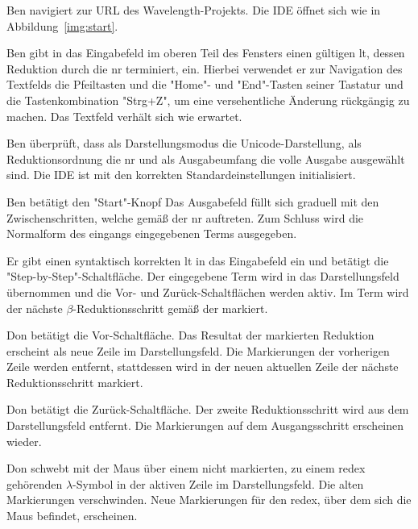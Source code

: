 \documentclass[parskip=full,11pt,twoside]{scrartcl}
\begin{document}
{Ben navigiert zur URL des Wavelength-Projekts.}
{Die IDE öffnet sich wie in Abbildung~\ref{img:start}.}

{Ben gibt in das Eingabefeld im oberen Teil des Fensters einen gültigen \gls{lt},
dessen Reduktion durch die \gls{nr} terminiert, ein.
Hierbei verwendet er zur Navigation des Textfelds die Pfeiltasten und die
"Home"- und "End"-Tasten seiner Tastatur und die Tastenkombination "Strg+Z", um eine
versehentliche Änderung rückgängig zu machen.}
{Das Textfeld verhält sich wie erwartet.}

{Ben überprüft, dass als Darstellungsmodus die Unicode-Darstellung, als Reduktionsordnung
die \gls{nr} und als Ausgabeumfang die volle Ausgabe ausgewählt sind.}
{Die IDE ist mit den korrekten Standardeinstellungen initialisiert.}

{Ben betätigt den "Start"-Knopf}
{Das Ausgabefeld füllt sich graduell mit den Zwischenschritten, welche gemäß der \gls{nr} auftreten.
Zum Schluss wird die Normalform des eingangs eingegebenen Terms ausgegeben.}


{Er gibt einen syntaktisch korrekten \gls{lt} in das Eingabefeld ein und betätigt
die "Step-by-Step"-Schaltfläche.}
{Der eingegebene Term wird in das Darstellungsfeld übernommen und die Vor- und
Zurück-Schaltflächen werden aktiv. Im Term wird der nächste $\beta$-Reduktionsschritt
gemäß der  markiert.}

{Don betätigt die Vor-Schaltfläche.}
{Das Resultat der markierten Reduktion erscheint als neue Zeile im Darstellungsfeld.
Die Markierungen der vorherigen Zeile werden entfernt, stattdessen wird in der neuen
aktuellen Zeile der nächste Reduktionsschritt markiert.}

{Don betätigt die Zurück-Schaltfläche.}
{Der zweite Reduktionsschritt wird aus dem Darstellungsfeld entfernt. Die Markierungen
auf dem Ausgangsschritt erscheinen wieder.}

{Don schwebt mit der Maus über einem nicht markierten, zu einem \gls{redex} gehörenden
$\lambda$-Symbol in der aktiven Zeile im Darstellungsfeld.}
{Die alten Markierungen verschwinden. Neue Markierungen für den \gls{redex}, über dem
sich die Maus befindet, erscheinen.}
\end{document}
